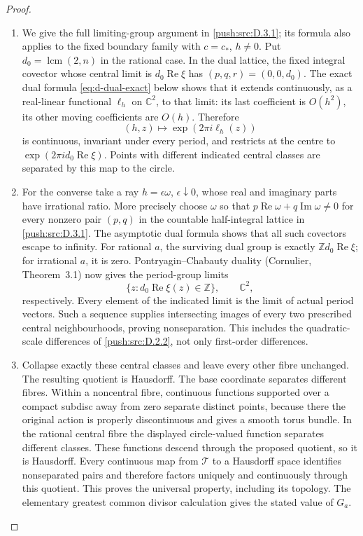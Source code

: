 \begin{proof}
\begin{enumerate}[label=\arabic*.,leftmargin=*]
\item We give the full limiting-group argument in \ref{push:src:D.3.1}; its formula also
applies to the fixed boundary family with \(c=c_*\), \(h\ne0\).
Put \(d_0=\operatorname{lcm}(2,n)\) in the rational case. In the dual
lattice, the fixed integral covector whose central limit is
\(d_0\operatorname{Re}\xi\) has
\((p,q,r)=(0,0,d_0)\). The exact dual formula
\eqref{eq:d-dual-exact} below shows that it extends continuously, as a
real-linear functional \(\ell_h\) on \(\mathbb C^2\), to that limit:
its last coefficient is \(O(h^2)\), its other moving coefficients
are \(O(h)\). Therefore
\[
 (h,z)\longmapsto\exp(2\pi i\ell_h(z))
\]
is continuous, invariant under every period, and restricts at the
centre to \(\exp(2\pi i d_0\operatorname{Re}\xi)\).
Points with different indicated central classes are separated by this
map to the circle.

\item For the converse take a ray \(h=\epsilon\omega\),
\(\epsilon\downarrow0\), whose real and imaginary parts have
irrational ratio. More precisely choose \(\omega\) so that
\(p\operatorname{Re}\omega+q\operatorname{Im}\omega\ne0\)
for every nonzero pair \((p,q)\) in the countable half-integral
lattice in \ref{push:src:D.3.1}. The asymptotic dual formula shows that all such
covectors escape to infinity. For rational \(a\), the surviving dual
group is exactly \(\mathbb Z d_0\operatorname{Re}\xi\); for
irrational \(a\), it is zero. Pontryagin--Chabauty duality
(Cornulier, Theorem~3.1) now gives the period-group limits
\[
 \{z:d_0\operatorname{Re}\xi(z)\in\mathbb Z\},\qquad
 \mathbb C^2,
\]
respectively. Every element of the indicated limit is the limit of
actual period vectors. Such a sequence supplies intersecting images
of every two prescribed central neighbourhoods, proving
nonseparation. This includes the quadratic-scale differences of
\ref{push:src:D.2.2}, not only first-order differences.

\item Collapse exactly these central classes and leave every other fibre
unchanged. The resulting quotient is Hausdorff. The base coordinate
separates different fibres. Within a noncentral fibre, continuous
functions supported over a compact subdisc away from zero separate
distinct points, because there the original action is properly
discontinuous and gives a smooth torus bundle. In the rational central
fibre the displayed circle-valued function separates different
classes. These functions descend through the proposed quotient, so
it is Hausdorff. Every continuous map from \(\mathcal T\) to a
Hausdorff space identifies nonseparated pairs and therefore factors
uniquely and continuously through this quotient. This proves the
universal property, including its topology. The elementary greatest
common divisor calculation gives the stated value of \(G_a\).
\end{enumerate}
\end{proof}

